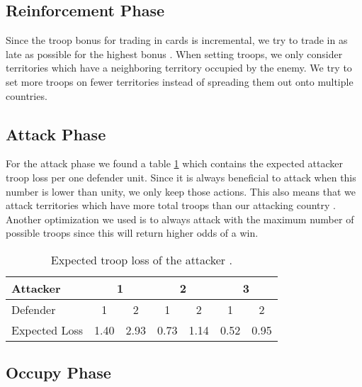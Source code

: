 \documentclass[conference]{IEEEtran}
\begin{document}
\subsection{Reinforcement Phase}
\label{subsec:reinforcement phase}

Since the troop bonus for trading in cards is incremental,
we try to trade in as late as possible for the highest bonus \cite{web:1v1-risk-strategy}.
When setting troops, we only consider territories which have a neighboring territory occupied by the enemy.
We try to set more troops on fewer territories instead of spreading them out onto multiple countries.

\subsection{Attack Phase}
\label{subsec:attack-phase}

For the attack phase we found a table \ref{tab:expexted-troop-loss}
which contains the expected attacker troop loss per one defender unit.
Since it is always beneficial to attack when this number is lower than unity, we only keep those actions.
This also means that we attack territories which have more total troops than our attacking country \cite{osborne2003markov}.
Another optimization we used is to always attack with the maximum number of possible troops
since this will return higher odds of a win.

\begin{table}[htbp]
    \caption{Expected troop loss of the attacker \cite{web:per-attack-dice}.}
    \label{tab:expexted-troop-loss}
    \begin{center}
        \begin{tabular}{|l|c|c|c|c|c|c|}
            \hline
            Attacker & \multicolumn{2}{|c|}{1} & \multicolumn{2}{|c|}{2} & \multicolumn{2}{|c|}{3} \\
            \hline
            Defender & 1 & 2 & 1 & 2 & 1 & 2 \\
            \hline
            Expected Loss & 1.40 & 2.93 & 0.73 & 1.14 & 0.52 & 0.95 \\
            \hline
        \end{tabular}
    \end{center}
\end{table}

\subsection{Occupy Phase}
\label{subsec:occupy-phase}
\end{document}
